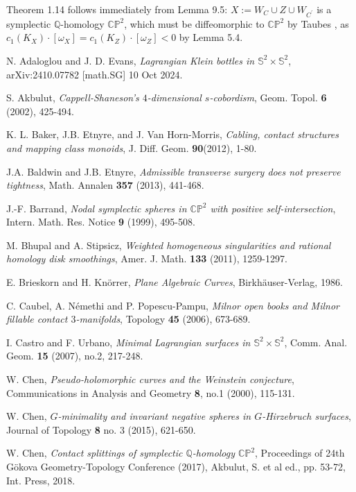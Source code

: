 \documentclass[11pt]{amsart}
\theoremstyle{plain}
\numberwithin{theorem}{section}
\theoremstyle{definition}
\newcommand{\C}{{\mathbb C}}
\newcommand{\Q}{{\mathbb Q}}
\renewcommand{\P}{{\mathbb P}}
\newcommand{\s}{{\mathbb S}}
\begin{document}
Theorem 1.14 follows immediately from Lemma 9.5: $X:=W_C\cup Z\cup W_{C^\prime}$ is a
symplectic $\Q$-homology $\C\P^2$, which must be diffeomorphic to $\C\P^2$ by Taubes \cite{T},
as $c_1(K_X)\cdot [\omega_X]=c_1(K_{Z})\cdot [\omega_{Z}]<0$ by Lemma 5.4. 


\begin{thebibliography}{}  

 N. Adaloglou and J. D. Evans, {\em Lagrangian Klein bottles in $\s^2\times \s^2$}, 	arXiv:2410.07782 [math.SG] 10 Oct 2024. 

 S. Akbulut, {\em Cappell-Shaneson's $4$-dimensional $s$-cobordism}, Geom. Topol.
{\bf 6} (2002), 425-494.

 K. L. Baker, J.B. Etnyre, and J. Van Horn-Morris, {\em Cabling, contact structures
and mapping class monoids}, J. Diff. Geom. {\bf 90}(2012), 1-80.

 J.A. Baldwin and J.B. Etnyre, {\em Admissible transverse surgery does not preserve tightness}, Math. Annalen {\bf 357} (2013), 441-468.

 J.-F. Barrand, {\em Nodal symplectic spheres in $\C\P^2$ with positive 
self-intersection}, Intern. Math. Res. Notice {\bf 9} (1999), 495-508. 

 M. Bhupal and A. Stipsicz, {\em Weighted homogeneous singularities and rational homology disk smoothings}, Amer. J. Math. {\bf 133} (2011), 1259-1297.


 E. Brieskorn and H. Kn\"{o}rrer, {\em Plane Algebraic Curves}, Birkh\"{a}user-Verlag, 1986.

 C. Caubel, A. N\'{e}methi and P. Popescu-Pampu, {\em Milnor open books and 
Milnor fillable contact $3$-manifolds}, Topology {\bf 45} (2006), 673-689.

 I. Castro and F. Urbano, {\em Minimal Lagrangian surfaces in $\s^2\times \s^2$}, Comm. Anal. 
Geom. {\bf 15} (2007), no.2, 217-248.

 W. Chen, {\em Pseudo-holomorphic curves and the Weinstein conjecture}, Communications in Analysis and Geometry {\bf 8}, no.1 (2000), 115-131.

 W. Chen, {\em $G$-minimality and invariant negative spheres in $G$-Hirzebruch 
surfaces}, Journal of Topology {\bf 8} no. 3 (2015), 621-650.

 W. Chen,  {\em Contact splittings of symplectic $\Q$-homology $\C\P^2$}, 
Proceedings of 24th G\"{o}kova Geometry-Topology Conference (2017), Akbulut, S. et al ed., pp. 53-72, Int. Press, 2018.


\end{thebibliography}
\end{document}
